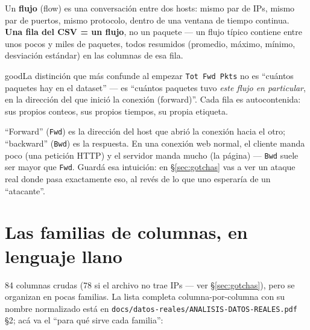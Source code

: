 \documentclass[11pt]{article}
\newcommand{\code}[1]{\texttt{\small #1}}
\begin{document}
Un \textbf{flujo} (flow) es una conversación entre dos hosts: mismo par de IPs, mismo par
de puertos, mismo protocolo, dentro de una ventana de tiempo continua. \textbf{Una fila
del CSV = un flujo}, no un paquete --- un flujo típico contiene entre unos pocos y miles
de paquetes, todos resumidos (promedio, máximo, mínimo, desviación estándar) en las
columnas de esa fila.

\begin{cbox}{good}{La distinción que más confunde al empezar}
\code{Tot Fwd Pkts} no es ``cuántos paquetes hay en el dataset'' --- es ``cuántos
paquetes tuvo \emph{este flujo en particular}, en la dirección del que inició la
conexión (forward)''. Cada fila es autocontenida: sus propios conteos, sus propios
tiempos, su propia etiqueta.
\end{cbox}

``Forward'' (\code{Fwd}) es la dirección del host que abrió la conexión hacia el otro;
``backward'' (\code{Bwd}) es la respuesta. En una conexión web normal, el cliente
manda poco (una petición HTTP) y el servidor manda mucho (la página) --- \code{Bwd} suele
ser mayor que \code{Fwd}. Guardá esa intuición: en \S\ref{sec:gotchas} vas a ver un
ataque real donde pasa exactamente eso, al revés de lo que uno esperaría de un
``atacante''.

\section{Las familias de columnas, en lenguaje llano}

84 columnas crudas (78 si el archivo no trae IPs --- ver \S\ref{sec:gotchas}), pero se
organizan en pocas familias. La lista completa columna-por-columna con su nombre
normalizado está en \code{docs/datos-reales/ANALISIS-DATOS-REALES.pdf} \S2; acá va el
``para qué sirve cada familia'':
\end{document}
